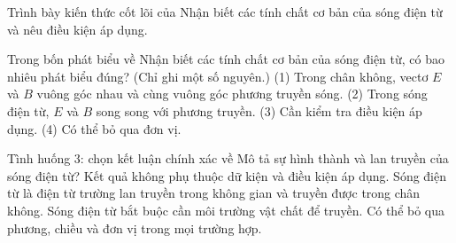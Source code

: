 \begin{bt}
Trình bày kiến thức cốt lõi của Nhận biết các tính chất cơ bản của sóng điện từ và nêu điều kiện áp dụng.
\end{bt}

\begin{ex}
Trong bốn phát biểu về Nhận biết các tính chất cơ bản của sóng điện từ, có bao nhiêu phát biểu đúng? (Chỉ ghi một số nguyên.) (1) Trong chân không, vectơ $E$ và $B$ vuông góc nhau và cùng vuông góc phương truyền sóng. (2) Trong sóng điện từ, $E$ và $B$ song song với phương truyền. (3) Cần kiểm tra điều kiện áp dụng. (4) Có thể bỏ qua đơn vị.
\end{ex}

\begin{ex}
Tình huống 3: chọn kết luận chính xác về Mô tả sự hình thành và lan truyền của sóng điện từ?
\choice
{Kết quả không phụ thuộc dữ kiện và điều kiện áp dụng.}
{\True Sóng điện từ là điện từ trường lan truyền trong không gian và truyền được trong chân không.}
{Sóng điện từ bắt buộc cần môi trường vật chất để truyền.}
{Có thể bỏ qua phương, chiều và đơn vị trong mọi trường hợp.}
\end{ex}

